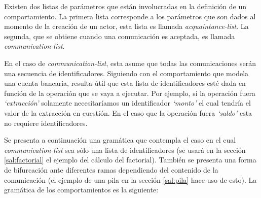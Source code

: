 Existen dos listas de parámetros que están involucradas en la definición de un comportamiento. La primera lista corresponde a los parámetros que son dados al momento de la creación de un actor, esta lista es llamada \textit{acquaintance-list}. La segunda, que se obtiene cuando una comunicación es aceptada, es llamada \textit{communication-list}.

En el caso de \textit{communication-list}, esta asume que todas las comunicaciones serán una secuencia de identificadores. Siguiendo con el comportamiento que modela una cuenta bancaria, resulta útil que esta lista de identificadores esté dada en función de la operación que se vaya a ejecutar. Por ejemplo, si la operación fuera \textit{`extracción'} solamente necesitaríamos un identificador \textit{`monto'} el cual tendría el valor de la extracción en cuestión. En el caso que la operación fuera \textit{`saldo'} esta no requiere identificadores. 

Se presenta a continuación una gramática que contempla el caso en el cual \textit{communication}\textit{-list} sea sólo una lista de identificadores (se usará en la sección \ref{sal:factorial} el ejemplo del cálculo del factorial). También se presenta una forma de bifurcación ante diferentes ramas dependiendo del contenido de la comunicación (el ejemplo de una pila en la sección \ref{sal:pila} hace uso de esto). La gramática de los comportamientos es la siguiente:

